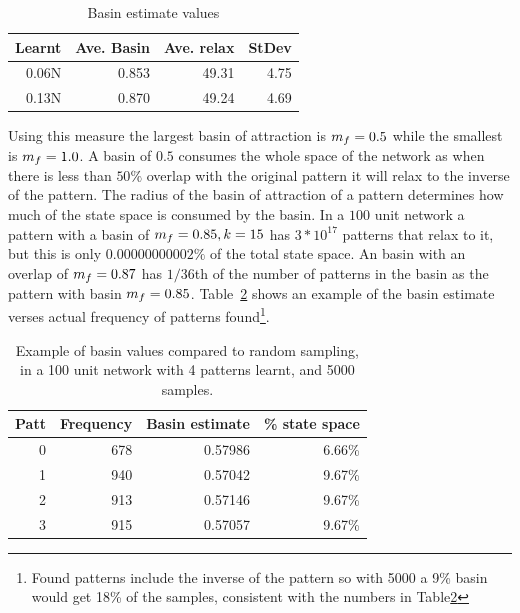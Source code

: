\begin{table}[h]
	\begin{center}        
		\begin{tabular}{r|rrr}
			Learnt & Ave. Basin \overlap & Ave. relax & StDev\\
			\hline 
			0.06N	& 0.853	& 49.31 & 4.75\\
			0.13N & 0.870 & 49.24 & 4.69
		\end{tabular}
	\end{center}
	\label{tab:basinsampling}
	\caption{Basin estimate values}
\end{table}

Using this measure the largest basin of attraction is $m_f = 0.5$ while the smallest is $m_f=1.0$.  A basin of $0.5$ consumes the whole space of the network as when there is less than $50\%$ overlap with the original pattern it will relax to the inverse of the pattern. The radius of the basin of attraction of a pattern determines how much of the state space is consumed by the basin.  In a $100$ unit network a pattern with a basin of $m_f=0.85,k=15$ has $3 * 10^{17}$ patterns that relax to it, but this is only $0.00000000002\%$ of the total state space.  An basin with an overlap of $m_f = 0.87$ has $1/36$th of the number of patterns in the basin as the pattern with basin $m_f=0.85$.  Table~\ref{tab:basinexample} shows an example of the basin estimate verses actual frequency of patterns found\footnote{Found patterns include the inverse of the pattern so with 5000 a 9\% basin would get 18\% of the samples, consistent with the numbers in Table\ref{tab:basinexample}}.
\begin{table}[h]
	\begin{center}        
		\begin{tabular}{r|rrr}
			Patt & Frequency & Basin estimate & \% state space\\
			\hline 
			0	& 678 & 0.57986 & 6.66\%\\
			1 & 940 & 0.57042 &	9.67\%\\
			2 & 913 & 0.57146 & 9.67\%\\
			3 & 915 & 0.57057 & 9.67\%
		\end{tabular}
	\end{center}
	\label{tab:basinexample}
	\caption{Example of basin values compared to random sampling, in a 100 unit network with 4 patterns learnt, and 5000 samples.}
\end{table}

